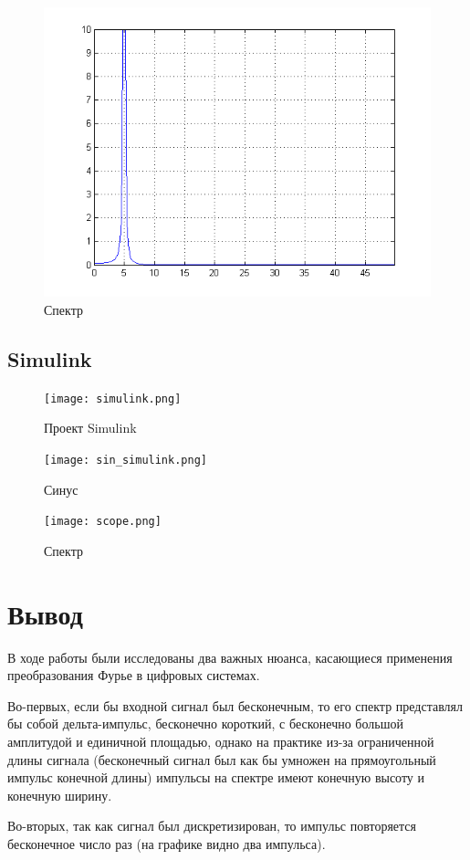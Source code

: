 \documentclass[a4paper, 12pt]{article}
\begin{document}
\begin{figure}[H]
   \includegraphics[scale=0.7]{spectre.png}
   \caption{Спектр}
\end{figure}

\subsection{Simulink}

\begin{figure}[H]
   \texttt{[image: simulink.png]}
   \caption{Проект Simulink}
\end{figure}

\begin{figure}[H]
   \texttt{[image: sin\_simulink.png]}
   \caption{Синус}
\end{figure}

\begin{figure}[H]
   \texttt{[image: scope.png]}
   \caption{Спектр}
\end{figure}

\section{Вывод}

В ходе работы были исследованы два важных нюанса, касающиеся применения преобразования Фурье в цифровых системах.

Во-первых, если бы входной сигнал был бесконечным, то его спектр представлял бы собой дельта-импульс, бесконечно короткий, с бесконечно большой амплитудой и единичной площадью, однако на практике из-за ограниченной длины сигнала (бесконечный сигнал был как бы умножен на прямоугольный импульс конечной длины) импульсы на спектре имеют конечную высоту и конечную ширину.

Во-вторых, так как сигнал был дискретизирован, то импульс повторяется бесконечное число раз (на графике видно два импульса).
\end{document}

